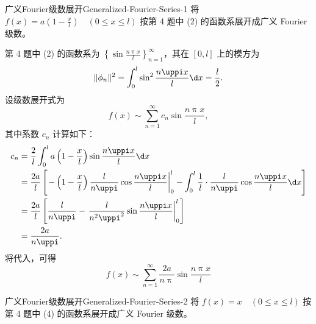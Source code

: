 \begin{problem}{广义Fourier级数展开}{Generalized-Fourier-Series-1}
    将 $f(x) = a \left(1 - \frac{x}{l}\right) \quad (0 \leqslant x \leqslant l)$ 按第 4 题中 (2) 的函数系展开成广义 Fourier 级数。
\end{problem}

\begin{solution}
    第 4 题中 (2) 的函数系为 $\left\{ \sin \frac{n\uppi x}{l} \right\}_{n=1}^{\infty}$，其在 $[0, l]$ 上的模方为
    \begin{equation}\label{eq:norm-5}
        \|\phi_n\|^2 = \int_{0}^{l} \sin^2 \frac{n\uppi x}{l} \d x = \frac{l}{2}.
    \end{equation}
    设级数展开式为
    \begin{equation}\label{eq:series-5}
        f(x) \sim \sum_{n=1}^{\infty} c_n \sin \frac{n\uppi x}{l},
    \end{equation}
    其中系数 $c_n$ 计算如下：
    \begin{equation}\label{eq:coeff-5}
        \begin{aligned}
            c_n & = \frac{2}{l} \int_{0}^{l} a \left(1 - \frac{x}{l}\right) \sin \frac{n\uppi x}{l} \d x                                                                                                                      \\
                & = \frac{2a}{l} \left[ \left. -\left(1 - \frac{x}{l}\right) \frac{l}{n\uppi} \cos \frac{n\uppi x}{l} \right|_{0}^{l} - \int_{0}^{l} \frac{1}{l} \cdot \frac{l}{n\uppi} \cos \frac{n\uppi x}{l} \d x  \right] \\
                & = \frac{2a}{l} \left[ \frac{l}{n\uppi} - \left. \frac{l}{n^2\uppi^2} \sin \frac{n\uppi x}{l} \right|_{0}^{l} \right]                                                                                        \\
                & = \frac{2a}{n\uppi}.
        \end{aligned}
    \end{equation}
    将代入，可得
    \begin{equation}
        \boxed{f(x) \sim \sum_{n=1}^{\infty} \frac{2a}{n\uppi} \sin \frac{n\uppi x}{l}}
    \end{equation}
\end{solution}

\begin{problem}{广义Fourier级数展开}{Generalized-Fourier-Series-2}
    将 $f(x) = x \quad (0 \leqslant x \leqslant l)$ 按第 4 题中 (4) 的函数系展开成广义 Fourier 级数。
\end{problem}

